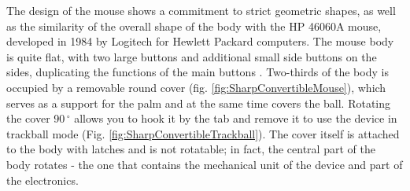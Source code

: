 \documentclass[11pt, a4paper]{article}
\begin{document}
The design of the mouse shows a commitment to strict geometric shapes, as well as the similarity of the overall shape of the body with the HP 46060A mouse, developed in 1984 by Logitech for Hewlett Packard computers. The mouse body is quite flat, with two large buttons and additional small side buttons on the sides, duplicating the functions of the main buttons \cite{JapaneseVintage}. Two-thirds of the body is occupied by a removable round cover (fig. \ref{fig:SharpConvertibleMouse}), which serves as a support for the palm and at the same time covers the ball. Rotating the cover 90\,$^\circ$ allows you to hook it by the tab and remove it to use the device in trackball mode (Fig. \ref{fig:SharpConvertibleTrackball}). The cover itself is attached to the body with latches and is not rotatable; in fact, the central part of the body rotates - the one that contains the mechanical unit of the device and part of the electronics.
\end{document}
